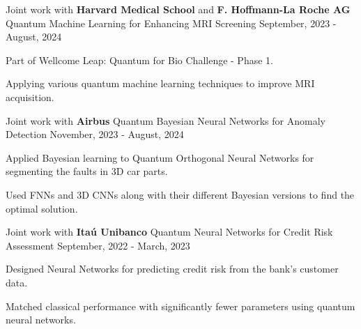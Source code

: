 

\begin{cventries}

  \cventry
    {Joint work with \textbf{Harvard Medical School} and \textbf{F. Hoffmann-La Roche AG}} %
    {Quantum Machine Learning for Enhancing MRI Screening} %
    {} %
    {September, 2023 - August, 2024} %
    {
      \begin{cvitems} %
        \item {Part of Wellcome Leap: Quantum for Bio Challenge - Phase 1.}
        \item {Applying various quantum machine learning techniques to improve MRI acquisition.}
      \end{cvitems}
    }

  \cventry
    {Joint work with \textbf{Airbus}} %
    {Quantum Bayesian Neural Networks for Anomaly Detection} %
    {} %
    {November, 2023 - August, 2024} %
    {
      \begin{cvitems} %
        \item {Applied Bayesian learning to Quantum Orthogonal Neural Networks for segmenting the faults in 3D car parts.}
        \item {Used FNNs and 3D CNNs along with their different Bayesian versions to find the optimal solution.}
      \end{cvitems}
    }

  \cventry
    {Joint work with \textbf{Itaú Unibanco}} %
    {Quantum Neural Networks for Credit Risk Assessment} %
    {} %
    {September, 2022 - March, 2023} %
    {
      \begin{cvitems} %
        \item {Designed Neural Networks for predicting credit risk from the bank's customer data.}
        \item {Matched classical performance with significantly fewer parameters using quantum neural networks.}
      \end{cvitems}
    }


\end{cventries}
